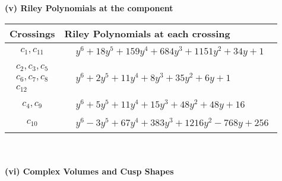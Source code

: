 \documentclass[1p]{elsarticle_modified}
\theoremstyle{definition}
\begin{document}
\newpage\renewcommand{\arraystretch}{1}
\flushleft \textbf{(v) Riley Polynomials at the component}\newline \\
\begin{tabular}{m{50pt}|m{274pt}}
Crossings & \hspace{64pt}Riley Polynomials at each crossing \\
\hline $$\begin{aligned}c_{1},c_{11}\end{aligned}$$&$\begin{aligned}
&y^6+18 y^5+159 y^4+684 y^3+1151 y^2+34 y+1
\end{aligned}$\\
\hline $$\begin{aligned}c_{2},c_{3},c_{5}\\c_{6},c_{7},c_{8}\\c_{12}\end{aligned}$$&$\begin{aligned}
&y^6+2 y^5+11 y^4+8 y^3+35 y^2+6 y+1
\end{aligned}$\\
\hline $$\begin{aligned}c_{4},c_{9}\end{aligned}$$&$\begin{aligned}
&y^6+5 y^5+11 y^4+15 y^3+48 y^2+48 y+16
\end{aligned}$\\
\hline $$\begin{aligned}c_{10}\end{aligned}$$&$\begin{aligned}
&y^6-3 y^5+67 y^4+383 y^3+1216 y^2-768 y+256
\end{aligned}$\\
\hline
\end{tabular}\\~\\
\newpage\flushleft \textbf{(vi) Complex Volumes and Cusp Shapes}
\end{document}
